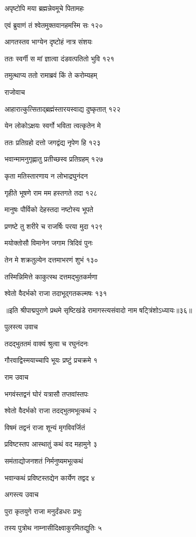 अपृष्टोपि मया ब्रह्मन्नेवमूचे पितामहः

एवं ब्रुवाणं तं श्वेतमुक्तवानहमस्मि सः १२०

आगतस्तव भाग्येन दृष्टोहं नात्र संशयः

ततः स्वर्गी स मां ज्ञात्वा दंडवत्पतितो भुवि १२१

तमुत्थाप्य ततो रामाब्रवं किं ते करोम्यहम्

राजोवाच

आहारात्कुत्सिताद्ब्रह्मंस्तारयस्वाद्य दुष्कृतात् १२२

येन लोकोऽक्षयः स्वर्गो भविता त्वत्कृतेन मे

ततः प्रतिग्रहो दत्तो जगद्वंद्य नृपेण हि १२३

भवान्मामनुगृह्णातु प्रतीच्छस्व प्रतिग्रहम् १२७

कृता मतिस्तारणाय न लोभाद्रघुनंदन

गृहीते भूषणे राम मम हस्तगते तदा १२८

मानुषः पौर्विको देहस्तदा नष्टोस्य भूपते

प्रणष्टे तु शरीरे च राजर्षिः परया मुदा १२९

मयोक्तोसौ विमानेन जगाम त्रिदिवं पुनः

तेन मे शक्रतुल्येन दत्तमाभरणं शुभं १३०

तस्मिन्निमित्ते काकुत्स्थ दत्तमद्भुतकर्मणा

श्वेतो वैदर्भको राजा तदाभूद्गतकल्मषः १३१ 

॥इति श्रीपाद्मपुराणे प्रथमे सृष्टिखंडे रामागस्त्यसंवादो नाम षट्त्रिंशोऽध्यायः॥३६॥


पुलस्त्य उवाच

तदद्भुततमं वाक्यं श्रुत्वा च रघुनंदनः

गौरवाद्विस्मयाच्चापि भूयः प्रष्टुं प्रचक्रमे १

राम उवाच

भगवंस्तद्वनं घोरं यत्रासौ तप्तवांस्तपः

श्वेतो वैदर्भको राजा तदद्भुतमभूत्कथं २

विषमं तद्वनं राजा शून्यं मृगविवर्जितं

प्रविष्टस्तप आस्थातुं कथं वद महामुने ३

समंताद्योजनशतं निर्मनुष्यमभूत्कथं

भवान्कथं प्रविष्टस्तद्येन कार्येण तद्वद ४

अगस्त्य उवाच

पुरा कृतयुगे राजा मनुर्दंडधरः प्रभुः

तस्य पुत्रोथ नाम्नासीदिक्ष्वाकुरमितद्युतिः ५


